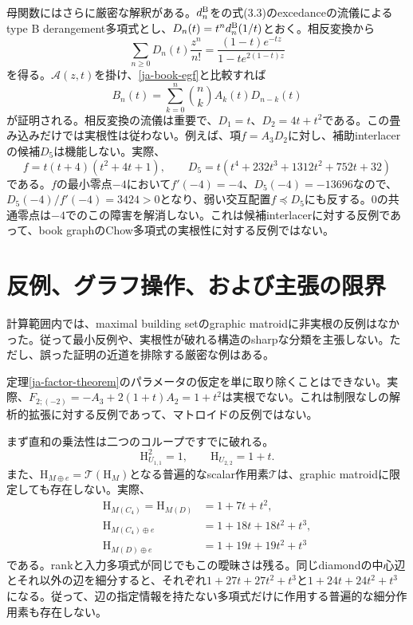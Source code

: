 \documentclass[12pt]{amsart}
\theoremstyle{definition}
\theoremstyle{remark}
\numberwithin{equation}{section}
\newcommand{\HCh}{\mathrm{H}}
\begin{document}
母関数にはさらに厳密な解釈がある。$d_n^{\rm B}$を\cite{Ma20}の式(3.3)のexcedanceの流儀によるtype B derangement多項式とし、$D_n(t)=t^n d_n^{\rm B}(1/t)$とおく。相反変換から
\[
 \sum_{n\geq0}D_n(t)\frac{z^n}{n!}
 =\frac{(1-t)e^{-tz}}{1-t e^{2(1-t)z}}
\]
を得る。$\mathcal A(z,t)$を掛け、\eqref{ja-book-egf}と比較すれば
\begin{equation}\label{ja-book-convolution}
 B_n(t)=\sum_{k=0}^n\binom nk A_k(t)D_{n-k}(t)
\end{equation}
が証明される。相反変換の流儀は重要で、$D_1=t$、$D_2=4t+t^2$である。この畳み込みだけでは実根性は従わない。例えば、項$f=A_3D_2$に対し、補助interlacerの候補$D_5$は機能しない。実際、
\[
 f=t(t+4)(t^2+4t+1),\qquad
 D_5=t(t^4+232t^3+1312t^2+752t+32)
\]
である。$f$の最小零点$-4$において$f'(-4)=-4$、$D_5(-4)=-13696$なので、$D_5(-4)/f'(-4)=3424>0$となり、弱い交互配置$f\preceq D_5$にも反する。$0$の共通零点は$-4$でのこの障害を解消しない。これは候補interlacerに対する反例であって、book graphのChow多項式の実根性に対する反例ではない。

\section{反例、グラフ操作、および主張の限界}
計算範囲内では、maximal building setのgraphic matroidに非実根の反例はなかった。従って最小反例や、実根性が破れる構造のsharpな分類を主張しない。ただし、誤った証明の近道を排除する厳密な例はある。

定理\ref{ja-factor-theorem}のパラメータの仮定を単に取り除くことはできない。実際、$F_{2;(-2)}=-A_3+2(1+t)A_2=1+t^2$は実根でない。これは制限なしの解析的拡張に対する反例であって、マトロイドの反例ではない。

まず直和の乗法性は二つのコループですでに破れる。
\[
 \HCh_{U_{1,1}}^2=1,\qquad \HCh_{U_{2,2}}=1+t.
\]
また、$\HCh_{M\oplus e}=\mathcal T(\HCh_M)$となる普遍的なscalar作用素$\mathcal T$は、graphic matroidに限定しても存在しない。実際、
\begin{align*}
 \HCh_{M(C_4)}=\HCh_{M(D)}&=1+7t+t^2,\\
 \HCh_{M(C_4)\oplus e}&=1+18t+18t^2+t^3,\\
 \HCh_{M(D)\oplus e}&=1+19t+19t^2+t^3
\end{align*}
である。rankと入力多項式が同じでもこの曖昧さは残る。同じdiamondの中心辺とそれ以外の辺を細分すると、それぞれ$1+27t+27t^2+t^3$と$1+24t+24t^2+t^3$になる。従って、辺の指定情報を持たない多項式だけに作用する普遍的な細分作用素も存在しない。
\end{document}
